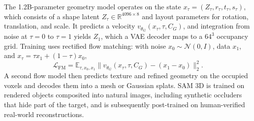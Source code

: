 \documentclass{article}
\begin{document}
The 1.2B-parameter geometry model operates on the state $x_\tau=(Z_\tau,r_\tau,t_\tau,s_\tau)$, which consists of a shape latent $Z_\tau\in\mathbb{R}^{4096\times8}$ and layout parameters for rotation, translation, and scale. It predicts a velocity $v_{\theta_G}(x_\tau,\tau,C_G)$, and integration from noise at $\tau=0$ to $\tau=1$ yields $Z_1$, which a VAE decoder maps to a $64^3$ occupancy grid. Training uses rectified flow matching: with noise $x_0\sim\mathcal{N}(0,I)$, data $x_1$, and $x_\tau=\tau x_1+(1-\tau)x_0$,
\begin{equation}
\mathcal{L}_{\mathrm{FM}}=\mathbb{E}_{\tau,x_0,x_1}\big\|v_{\theta_G}(x_\tau,\tau,C_G)-(x_1-x_0)\big\|_2^2.
\label{eq:fm}
\end{equation}
A second flow model then predicts texture and refined geometry on the occupied voxels and decodes them into a mesh or Gaussian splats. SAM 3D is trained on rendered objects composited into natural images, including synthetic occluders that hide part of the target, and is subsequently post-trained on human-verified real-world reconstructions.




\end{document}
